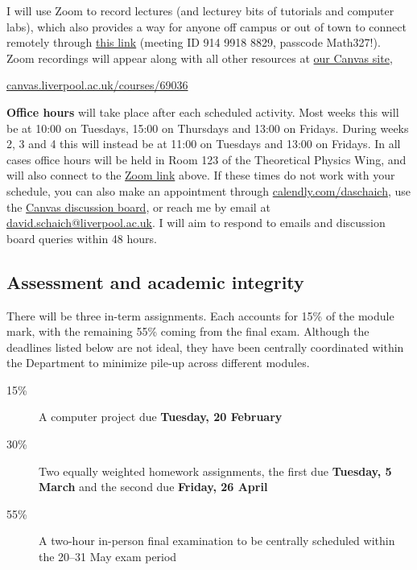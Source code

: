 I will use Zoom to record lectures (and lecturey bits of tutorials and computer labs), which also provides a way for anyone off campus or out of town to connect remotely through \href{https://liverpool-ac-uk.zoom.us/j/91499188829?pwd=R1dPNjZQUDloS2pGVmxNdWFzenFLQT09}{this link} (meeting ID 914 9918 8829, passcode Math327!).
Zoom recordings will appear along with all other resources at \href{canvas.liverpool.ac.uk/courses/69036}{our Canvas site}, \\
\centerline{\href{https://canvas.liverpool.ac.uk/courses/69036}{canvas.liverpool.ac.uk/courses/69036}}

\textbf{Office hours} will take place after each scheduled activity.
Most weeks this will be at 10:00 on Tuesdays, 15:00 on Thursdays and 13:00 on Fridays.
During weeks 2, 3 and 4 this will instead be at 11:00 on Tuesdays and 13:00 on Fridays. 
In all cases office hours will be held in Room 123 of the Theoretical Physics Wing, and will also connect to the \href{https://liverpool-ac-uk.zoom.us/j/91499188829?pwd=R1dPNjZQUDloS2pGVmxNdWFzenFLQT09}{Zoom link} above.
If these times do not work with your schedule, you can also make an appointment through \href{https://calendly.com/daschaich/meet}{calendly.com/daschaich}, use the \href{https://canvas.liverpool.ac.uk/courses/69036/discussion_topics}{Canvas discussion board}, or reach me by email at \href{mailto:david.schaich@liverpool.ac.uk}{david.schaich@liverpool.ac.uk}.
I will aim to respond to emails and discussion board queries within 48 hours.



\subsection*{Assessment and academic integrity}
There will be three in-term assignments.
Each accounts for 15\% of the module mark, with the remaining 55\% coming from the final exam.
Although the deadlines listed below are not ideal, they have been centrally coordinated within the Department to minimize pile-up across different modules.
\begin{description}
  \item[15\%] A computer project due \textbf{Tuesday, 20 February}
  \item[30\%] Two equally weighted homework assignments, the first due \textbf{Tuesday, 5 March} and the second due \textbf{Friday, 26 April}
  \item[55\%] A two-hour in-person final examination to be centrally scheduled within the 20--31 May exam period
\end{description}

